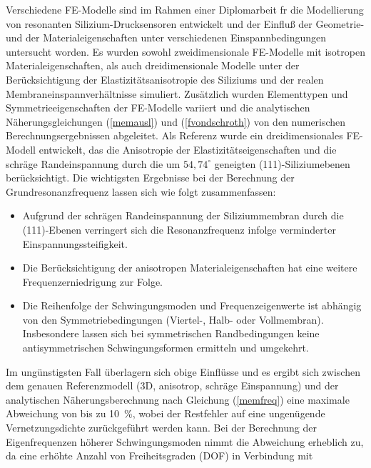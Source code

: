 Verschiedene FE-Modelle sind im Rahmen einer Diplomarbeit \cite{Sch92}
fr die Modellierung von resonanten Silizium-Drucksensoren entwickelt
und der Einfluß der Geometrie- und der Materialeigenschaften unter
verschiedenen Einspannbedingungen untersucht worden. Es wurden sowohl
zweidimensionale FE-Modelle mit isotropen Materialeigenschaften, als auch
dreidimensionale Modelle unter der Berücksichtigung der
Elastizitätsanisotropie des Siliziums und der realen
Membraneinspannverhältnisse simuliert. Zusätzlich wurden Elementtypen
und Symmetrieeigenschaften der FE-Modelle variiert und die analytischen
Näherungsgleichungen (\ref{memausl}) und (\ref{fvondschroth})
von den numerischen Berechnungsergebnissen abgeleitet. Als Referenz
wurde ein dreidimensionales FE-Modell entwickelt, das die Anisotropie
der Elastizitätseigenschaften und die schräge Randeinspannung durch
die um $54,74^{\circ}$ geneigten (111)-Siliziumebenen
berücksichtigt. Die wichtigsten Ergebnisse bei der Berechnung der
Grundresonanzfrequenz lassen sich wie folgt zusammenfassen:
\begin{itemize}
\item
Aufgrund der schrägen Randeinspannung der Siliziummembran durch die
(111)-Ebenen verringert sich die Resonanzfrequenz infolge verminderter
Einspannungssteifigkeit.
\item
Die Berücksichtigung der anisotropen Materialeigenschaften hat eine
weitere Frequenzerniedrigung %
zur Folge.
\item
Die Reihenfolge der Schwingungsmoden und Frequenzeigenwerte ist abhängig
von den Symmetriebedingungen (Viertel-, Halb- oder Vollmembran).
Insbesondere lassen sich bei symmetrischen Randbedingungen keine
antisymmetrischen Schwingungsformen ermitteln und umgekehrt.
\end{itemize}
Im ungünstigsten Fall überlagern sich obige Einflüsse und es ergibt sich
zwischen dem genauen Referenzmodell (3D, anisotrop, schräge Einspannung)
und der analytischen Näherungsberechnung nach Gleichung (\ref{memfreq})
eine maximale Abweichung von bis zu 10~\%, wobei der Restfehler
auf eine ungenügende Vernetzungsdichte zurückgeführt werden kann. Bei der
Berechnung der Eigenfrequenzen höherer Schwingungsmoden
nimmt die Abweichung erheblich zu,
da eine erhöhte Anzahl von Freiheitsgraden (DOF) in Verbindung mit
